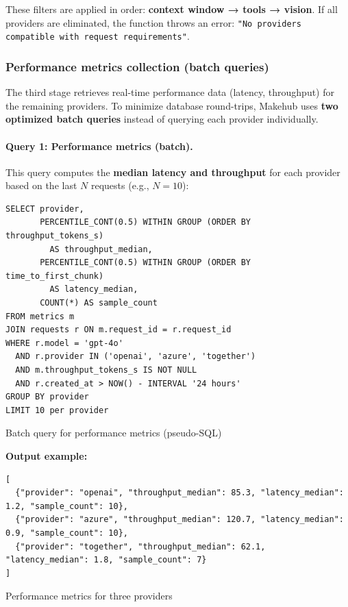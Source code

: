 \documentclass[english]{article}
\begin{document}
These filters are applied in order: \textbf{context window → tools → vision}. If all providers are eliminated, the function throws an error: \texttt{"No providers compatible with request requirements"}.

\subsubsection{Performance metrics collection (batch queries)}

The third stage retrieves real-time performance data (latency, throughput) for the remaining providers. To minimize database round-trips, Makehub uses \textbf{two optimized batch queries} instead of querying each provider individually.

\paragraph{Query 1: Performance metrics (batch).}

This query computes the \textbf{median latency and throughput} for each provider based on the last $N$ requests (e.g., $N=10$):

\begin{listing}[H]
\begin{verbatim}
SELECT provider,
       PERCENTILE_CONT(0.5) WITHIN GROUP (ORDER BY throughput_tokens_s)
         AS throughput_median,
       PERCENTILE_CONT(0.5) WITHIN GROUP (ORDER BY time_to_first_chunk)
         AS latency_median,
       COUNT(*) AS sample_count
FROM metrics m
JOIN requests r ON m.request_id = r.request_id
WHERE r.model = 'gpt-4o'
  AND r.provider IN ('openai', 'azure', 'together')
  AND m.throughput_tokens_s IS NOT NULL
  AND r.created_at > NOW() - INTERVAL '24 hours'
GROUP BY provider
LIMIT 10 per provider
\end{verbatim}
\caption{Batch query for performance metrics (pseudo-SQL)}
\end{listing}

\textbf{Output example:}
\begin{listing}[H]
\begin{verbatim}
[
  {"provider": "openai", "throughput_median": 85.3, "latency_median": 1.2, "sample_count": 10},
  {"provider": "azure", "throughput_median": 120.7, "latency_median": 0.9, "sample_count": 10},
  {"provider": "together", "throughput_median": 62.1, "latency_median": 1.8, "sample_count": 7}
]
\end{verbatim}
\caption{Performance metrics for three providers}
\end{listing}
\end{document}
